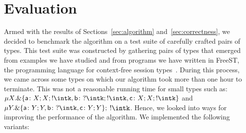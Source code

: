 \section{Evaluation}
\label{sec:evaluation}

Armed with the results of Sections~\ref{sec:algorithm}
and~\ref{sec:correctness}, we decided to benchmark the algorithm on a
test suite of carefully crafted pairs of types. This test suite was constructed by
gathering pairs of types that emerged from examples we have studied
and from programs we have written in FreeST, the programming language
for context-free session
types~\cite{almeida.etal_freest-functional-language}. 
During this process, we came across 
some types
%
%
on which our algorithm took more than one hour
to terminate. This was not a reasonable running time for small 
types such as: 
$\mu X . \&\{ \mathsf{a}\colon X;X; !\intk,
    \mathsf{b}\colon ?\intk;!\intk,
    \mathsf{c}\colon X;X;!\intk \}$
and 
$\mu Y . \&\{ \mathsf{a}\colon Y;Y,
    \mathsf{b}\colon ?\intk,
    \mathsf{c}\colon Y;Y \};$ $ !\intk$.
Hence, we
looked into ways for improving the performance of the algorithm. 
We implemented the
following variants: 
